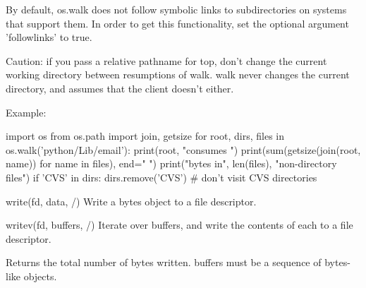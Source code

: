 \documentclass{article}
\begin{document}
        By default, os.walk does not follow symbolic links to subdirectories on
        systems that support them.  In order to get this functionality, set the
        optional argument 'followlinks' to true.

        Caution:  if you pass a relative pathname for top, don't change the
        current working directory between resumptions of walk.  walk never
        changes the current directory, and assumes that the client doesn't
        either.

        Example:

        import os
        from os.path import join, getsize
        for root, dirs, files in os.walk('python/Lib/email'):
            print(root, "consumes ")
            print(sum(getsize(join(root, name)) for name in files), end=" ")
            print("bytes in", len(files), "non-directory files")
            if 'CVS' in dirs:
                dirs.remove('CVS')  # don't visit CVS directories

    write(fd, data, /)
        Write a bytes object to a file descriptor.

    writev(fd, buffers, /)
        Iterate over buffers, and write the contents of each to a file descriptor.

        Returns the total number of bytes written.
        buffers must be a sequence of bytes-like objects.
\end{document}
